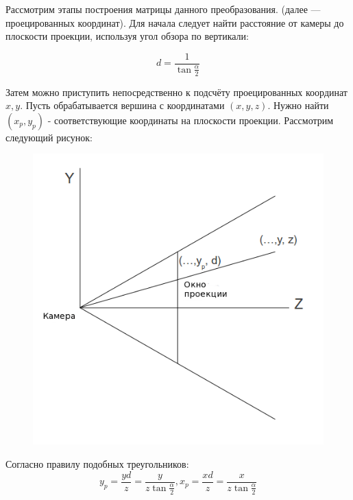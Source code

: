 Рассмотрим этапы построения матрицы данного преобразования.
(далее --- проецированных координат). Для начала следует найти расстояние от камеры до плоскости проекции, используя угол обзора по вертикали:

\begin{equation}d = \frac{1}{\tan{\frac{\alpha}{2}}} \end{equation}

Затем можно приступить непосредственно к подсчёту проецированных координат \begin{math}x, y\end{math}.
Пусть обрабатывается вершина с координатами \begin{math}(x, y, z)\end{math}. Нужно найти \begin{math}(x_p, y_p)\end{math} - соответствующие 
координаты на плоскости проекции.
Рассмотрим следующий рисунок:
  \begin{figure}\begin{center}\includegraphics[scale = 0.5]{cam.png} \end{center}\end{figure}
Согласно правилу подобных треугольников:
  \begin{equation}y_p = \frac{yd}{z} = \frac{y}{z\tan{\frac{\alpha}{2}}},    x_p = \frac{xd}{z} = \frac{x}{z\tan{\frac{\alpha}{2}}}\end{equation}

